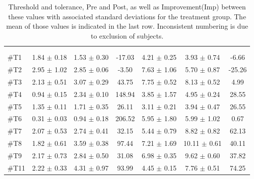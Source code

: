 \begin{longtable} {l|c|c|c|c|c|c}
	\caption{Threshold and tolerance, Pre and Post, as well as Improvement(Imp) between these values with associated standard deviations for the treatment group. The mean of those values is indicated in the last row. Inconsistent numbering is due to exclusion of subjects.}
	\label{tab:Treatment} \\
\cellcolor[HTML]{C0C0C0} {} & 
\multicolumn{3}{c|}{ \cellcolor[HTML]{C0C0C0}{\textbf{Threshold}}} & \multicolumn{3}{c}{ \cellcolor[HTML]{C0C0C0}{\textbf{Tolerance}}}  	\\  \rule{0pt}{3ex} 
  \cellcolor[HTML]{C0C0C0}{} &
 \multicolumn{1}{c|}{ \cellcolor[HTML]{C0C0C0}{Pre [kgF]}} & \multicolumn{1}{c|}{ \cellcolor[HTML]{C0C0C0}{Post [kgF]}} &
 \multicolumn{1}{c|}{ \cellcolor[HTML]{C0C0C0}{Imp [\%]}} 
 & \multicolumn{1}{|c|}{ \cellcolor[HTML]{C0C0C0}{Pre [kgF]}} 
 & \multicolumn{1}{c|}{ \cellcolor[HTML]{C0C0C0}{Post [kgF]}} 
 & \multicolumn{1}{c|}{ \cellcolor[HTML]{C0C0C0}{Imp [\%]}} 
 	\\ \hline 
\#T1 & 1.84 $\pm$ 0.18 & 1.53 $\pm$ 0.30 & -17.03
& 4.21 $\pm$ 0.25 & 3.93 $\pm$ 0.74 & -6.66\\ \hline
\#T2 & 2.95 $\pm$ 1.02 & 2.85 $\pm$ 0.06 & -3.50 & 7.63 $\pm$ 1.06  & 5.70 $\pm$ 0.87 & -25.26\\ \hline
\#T3 & 2.13 $\pm$ 0.51 & 3.07 $\pm$ 0.29 & 43.75 & 7.75 $\pm$ 0.52 & 8.13 $\pm$ 0.52 & 4.99 \\ \hline
\#T4 & 0.94 $\pm$ 0.15 & 2.34 $\pm$ 0.10 & 148.94 & 3.85 $\pm$ 1.57 & 4.95 $\pm$ 0.24 & 28.55\\ \hline
\#T5 & 1.35 $\pm$ 0.11 & 1.71 $\pm$ 0.35 & 26.11 & 3.11 $\pm$ 0.21  & 3.94 $\pm$ 0.47 & 26.55 \\ \hline	
\#T6 & 0.31 $\pm$ 0.03 & 0.94 $\pm$ 0.18 & 206.52 & 5.95 $\pm$ 1.80 & 5.99 $\pm$  1.02 & 0.67\\ \hline
\#T7 & 2.07 $\pm$ 0.53 & 2.74 $\pm$ 0.41 & 32.15 & 5.44 $\pm$ 0.79 & 8.82 $\pm$ 0.82 & 62.13  \\ \hline
\#T8 & 1.82 $\pm$ 0.61 & 3.59 $\pm$ 0.38 & 97.44 & 7.21 $\pm$ 1.69 & 10.11 $\pm$ 0.61 & 40.11 \\ \hline
\#T9 & 2.17 $\pm$ 0.73 & 2.84 $\pm$ 0.50 & 31.08 & 6.98 $\pm$  0.35 & 9.62 $\pm$ 0.60 & 37.82 \\ \hline
\#T11 & 2.22 $\pm$ 0.33 & 4.31 $\pm$ 0.97 & 93.99 & 4.45 $\pm$ 0.15 & 7.76 $\pm$  0.51 & 74.25 \\ \hline

\end{longtable}
